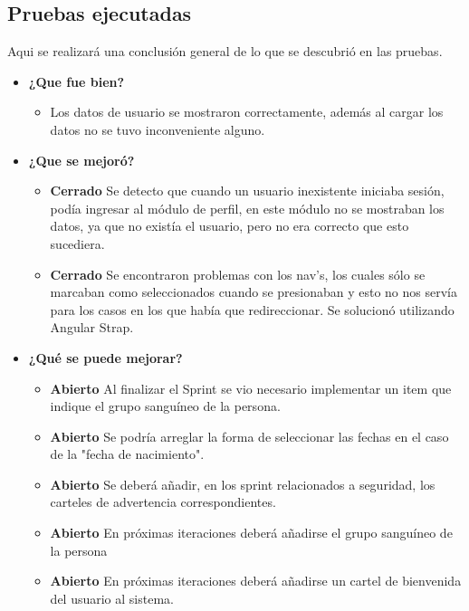 \subsection{Pruebas ejecutadas}
Aqui se realizará una conclusión general de lo que se descubrió en las pruebas.
	\begin{itemize}
		\item \textbf{¿Que fue bien?}
        	\begin{itemize}
				\item Los datos de usuario se mostraron correctamente, además al cargar  los datos no se tuvo inconveniente alguno.
			\end{itemize}
   		\item \textbf{¿Que se mejoró?}
        	\begin{itemize}
				\item \textbf{Cerrado}  Se detecto que cuando un usuario inexistente iniciaba sesión, podía ingresar al módulo de perfil, en este módulo no se mostraban los datos, ya que no existía  el usuario, pero no era correcto que esto sucediera.
                \item \textbf{Cerrado} Se encontraron problemas  con los nav's, los cuales sólo se marcaban como seleccionados cuando se presionaban y esto no nos servía para los casos en los que había que redireccionar. Se solucionó utilizando Angular Strap.
                
			\end{itemize}
   		\item \textbf{¿Qué se puede mejorar?}
        	\begin{itemize}
				\item \textbf{Abierto} Al finalizar el Sprint se vio necesario implementar un item que indique el grupo sanguíneo de la persona.
                \item \textbf{Abierto} Se podría arreglar la forma de seleccionar las fechas en el caso de la "fecha de nacimiento".
                \item \textbf{Abierto} Se deberá añadir, en los sprint relacionados a seguridad, los carteles de advertencia correspondientes.
                \item \textbf{Abierto} En próximas iteraciones deberá añadirse el grupo sanguíneo de la persona
                \item \textbf{Abierto} En próximas iteraciones deberá añadirse un cartel de bienvenida del usuario al sistema.
			\end{itemize}
    \end{itemize}


